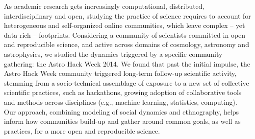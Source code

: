 As academic research gets increasingly computational, distributed, interdisciplinary and open, studying the practice of science requires to account for heterogeneous and self-organized online communities, which leave complex -- yet data-rich -- footprints. Considering a community of scientists committed in open and reproducible science, and active across domains of cosmology, astronomy and astrophysics, we studied the dynamics triggered by a specific community gathering: the Astro Hack Week 2014. We found that past the initial impulse, the Astro Hack Week community triggered long-term follow-up scientific activity, stemming from a socio-technical assemblage of exposure to a new set of collective scientific practices, such as hackathons, growing adoption of collaborative tools and methods across disciplines (e.g., machine learning, statistics, computing). Our approach, combining modeling of social dynamics and ethnography, helps inform how communities build-up and gather around common goals, as well as practices, for a more open and reproducible science.

